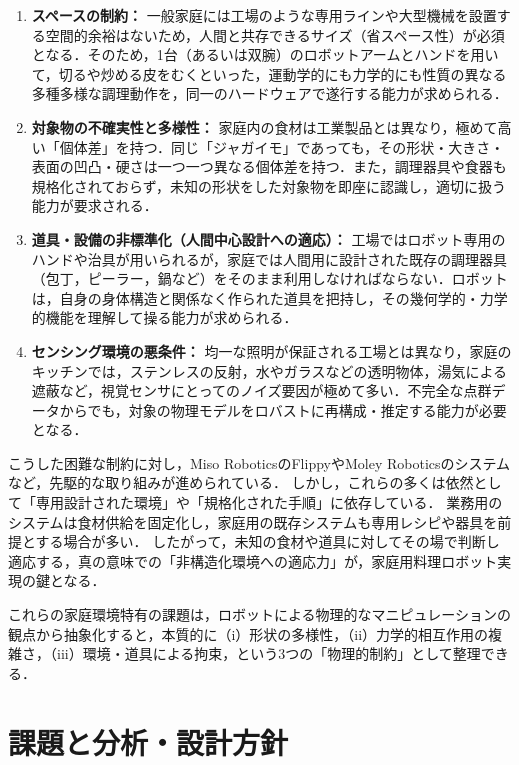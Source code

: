\begin{enumerate}
    \item \textbf{スペースの制約：} 一般家庭には工場のような専用ラインや大型機械を設置する空間的余裕はないため，人間と共存できるサイズ（省スペース性）が必須となる．そのため，1台（あるいは双腕）のロボットアームとハンドを用いて，切るや炒める皮をむくといった，運動学的にも力学的にも性質の異なる多種多様な調理動作を，同一のハードウェアで遂行する能力が求められる．
    
    \item \textbf{対象物の不確実性と多様性：} 家庭内の食材は工業製品とは異なり，極めて高い「個体差」を持つ．同じ「ジャガイモ」であっても，その形状・大きさ・表面の凹凸・硬さは一つ一つ異なる個体差を持つ．また，調理器具や食器も規格化されておらず，未知の形状をした対象物を即座に認識し，適切に扱う能力が要求される．

    \item \textbf{道具・設備の非標準化（人間中心設計への適応）：} 工場ではロボット専用のハンドや治具が用いられるが，家庭では人間用に設計された既存の調理器具（包丁，ピーラー，鍋など）をそのまま利用しなければならない．ロボットは，自身の身体構造と関係なく作られた道具を把持し，その幾何学的・力学的機能を理解して操る能力が求められる．

    \item \textbf{センシング環境の悪条件：} 均一な照明が保証される工場とは異なり，家庭のキッチンでは，ステンレスの反射，水やガラスなどの透明物体，湯気による遮蔽など，視覚センサにとってのノイズ要因が極めて多い．不完全な点群データからでも，対象の物理モデルをロバストに再構成・推定する能力が必要となる．
\end{enumerate}


こうした困難な制約に対し，Miso RoboticsのFlippy\cite{miso2025flippy_nextgen}やMoley Roboticsのシステムなど，先駆的な取り組みが進められている．
しかし，これらの多くは依然として「専用設計された環境」や「規格化された手順」に依存している．
業務用のシステムは食材供給を固定化し，家庭用の既存システムも専用レシピや器具を前提とする場合が多い．
したがって，未知の食材や道具に対してその場で判断し適応する，真の意味での「非構造化環境への適応力」が，家庭用料理ロボット実現の鍵となる．

これらの家庭環境特有の課題は，ロボットによる物理的なマニピュレーションの観点から抽象化すると，本質的に（i）形状の多様性，（ii）力学的相互作用の複雑さ，（iii）環境・道具による拘束，という3つの「物理的制約」として整理できる．


\section{課題と分析・設計方針}


